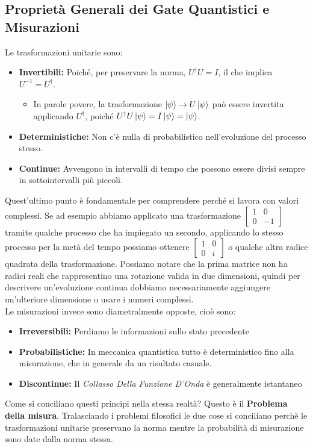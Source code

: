 \documentclass{article}
\begin{document}
    \subsection{Proprietà Generali dei Gate Quantistici e Misurazioni}
    Le trasformazioni unitarie sono:
    \begin{itemize}
        \item \textbf{Invertibili:} Poiché, per preservare la norma, $U^\dagger U = I$, il che implica $U^{-1} = U^\dagger$.
        \begin{itemize}
            \item In parole povere, la trasformazione $\ket{\psi} \to U\ket{\psi}$ può essere invertita applicando $U^\dagger$, poiché $U^\dagger U \ket{\psi} = I \ket{\psi} = \ket{\psi}$.
        \end{itemize}
        \item \textbf{Deterministiche:} Non c'è nulla di probabilistico nell'evoluzione del processo stesso.
        \item \textbf{Continue:} Avvengono in intervalli di tempo che possono essere divisi sempre in sottointervalli più piccoli.
    \end{itemize}
    Quest'ultimo punto è fondamentale per comprendere perché si lavora con valori complessi. Se ad esempio abbiamo applicato una trasformazione
    $\begin{bmatrix}
        1 & 0 \\ 0 & -1
    \end{bmatrix}$
    tramite qualche processo che ha impiegato un secondo, applicando lo stesso processo per la metà del tempo possiamo ottenere
    $\begin{bmatrix}
        1 & 0 \\ 0 & i
    \end{bmatrix}$
    o qualche altra radice quadrata della trasformazione. Possiamo notare che la prima matrice non ha radici reali che rappresentino una rotazione valida in due dimensioni, quindi per descrivere un'evoluzione continua dobbiamo necessariamente aggiungere un'ulteriore dimensione o usare i numeri complessi.
    \medskip
    \\ Le misurazioni invece sono diametralmente opposte, cioè sono:
    \begin{itemize}
        \item \textbf{Irreversibili:} Perdiamo le informazioni sullo stato precedente
        \item  \textbf{Probabilistiche:} In meccanica quantistica tutto è deterministico fino alla misurazione, che in generale da un risultato casuale.
        \item \textbf{Discontinue:} Il \textit{Collasso Della Funzione D'Onda} è generalmente istantaneo
    \end{itemize}
    Come si conciliano questi principi nella stessa realtà? Questo è il \textbf{Problema della misura}. Tralasciando i problemi filosofici le due cose si conciliano perchè le trasformazioni unitarie preservano la norma mentre la probabilità di misurazione sono date dalla norma stessa.
\end{document}
